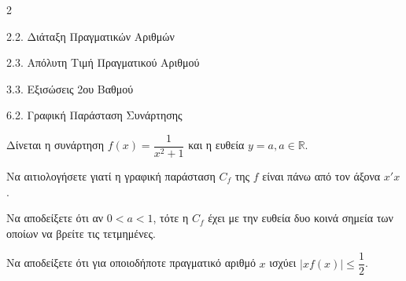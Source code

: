 \begin{ylh}{2}
    \item 2.2. Διάταξη Πραγματικών Αριθμών
    \item 2.3. Απόλυτη Τιμή Πραγματικού Αριθμού
    \item 3.3. Εξισώσεις 2ου Βαθμού
    \item 6.2. Γραφική Παράσταση Συνάρτησης
\end{ylh}
Δίνεται η συνάρτηση $f(x) = \dfrac{1}{x^2+1}$ και η ευθεία $y = a, a \in \mathbb{R}$.
\begin{alist}
\item Να αιτιολογήσετε γιατί η γραφική παράσταση $C_f$ της $f$ είναι πάνω από τον άξονα $x'x$. 
\item Να αποδείξετε ότι αν $0 < a < 1$, τότε η $C_f$ έχει με την ευθεία δυο κοινά σημεία των οποίων να βρείτε τις τετμημένες. 
\item Να αποδείξετε ότι για οποιοδήποτε πραγματικό αριθμό $x$ ισχύει $|xf(x)| \le \dfrac{1}{2}$. 
\end{alist}

